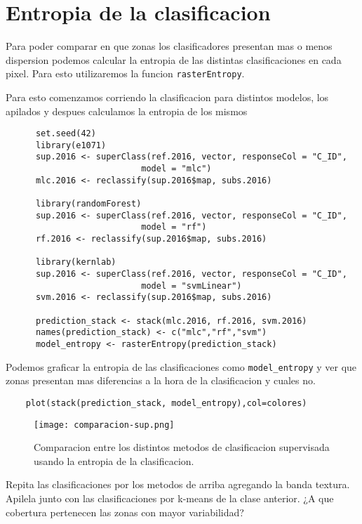 \section{Entropia de la clasificacion}

Para poder comparar en que zonas los clasificadores presentan mas o menos dispersion podemos calcular la entropia de las distintas clasificaciones en cada pixel. Para esto utilizaremos la funcion \texttt{rasterEntropy}.

\begin{exa}
  Para esto comenzamos corriendo la clasificacion para distintos modelos, los apilados y
  despues calculamos la entropia de los mismos

  \begin{lstlisting}
      set.seed(42)
      library(e1071)
      sup.2016 <- superClass(ref.2016, vector, responseCol = "C_ID",
                           model = "mlc")
      mlc.2016 <- reclassify(sup.2016$map, subs.2016)

      library(randomForest)
      sup.2016 <- superClass(ref.2016, vector, responseCol = "C_ID",
                           model = "rf")
      rf.2016 <- reclassify(sup.2016$map, subs.2016)

      library(kernlab)
      sup.2016 <- superClass(ref.2016, vector, responseCol = "C_ID",
                           model = "svmLinear")
      svm.2016 <- reclassify(sup.2016$map, subs.2016)

      prediction_stack <- stack(mlc.2016, rf.2016, svm.2016)
      names(prediction_stack) <- c("mlc","rf","svm")
      model_entropy <- rasterEntropy(prediction_stack)
  \end{lstlisting}

  Podemos graficar la entropia de las clasificaciones como \verb|model_entropy| y ver que zonas presentan mas diferencias a la hora de la clasificacion y cuales no.
  \begin{lstlisting}
    plot(stack(prediction_stack, model_entropy),col=colores)
  \end{lstlisting}
\end{exa}
  \begin{figure}
    \texttt{[image: comparacion-sup.png]}
    \caption{Comparacion entre los distintos metodos de clasificacion supervisada usando la entropia de la clasificacion.}
    \label{fig:entropia}
  \end{figure}
\begin{act}
  Repita las clasificaciones por los metodos de arriba agregando la banda textura. Apilela junto con las clasificaciones por k-means de la clase anterior. ¿A que cobertura pertenecen las zonas con mayor variabilidad?
\end{act}
